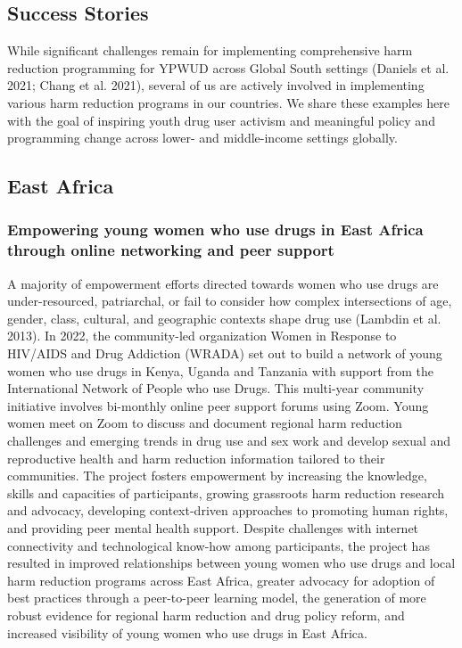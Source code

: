 \documentclass[
  letterpaper,
  DIV=11,
  numbers=noendperiod]{scrartcl}
\begin{document}
\subsection{Success Stories}\label{sec-success}

While significant challenges remain for implementing comprehensive harm
reduction programming for YPWUD across Global South settings (Daniels et
al. 2021; Chang et al. 2021), several of us are actively involved in
implementing various harm reduction programs in our countries. We share
these examples here with the goal of inspiring youth drug user activism
and meaningful policy and programming change across lower- and
middle-income settings globally.

\subsection{East Africa}

\subsubsection{Empowering young women who use drugs in East Africa
through online networking and peer
support}\label{empowering-young-women-who-use-drugs-in-east-africa-through-online-networking-and-peer-support}

A majority of empowerment efforts directed towards women who use drugs
are under-resourced, patriarchal, or fail to consider how complex
intersections of age, gender, class, cultural, and geographic contexts
shape drug use (Lambdin et al. 2013). In 2022, the community-led
organization Women in Response to HIV/AIDS and Drug Addiction (WRADA)
set out to build a network of young women who use drugs in Kenya, Uganda
and Tanzania with support from the International Network of People who
use Drugs. This multi-year community initiative involves bi-monthly
online peer support forums using Zoom. Young women meet on Zoom to
discuss and document regional harm reduction challenges and emerging
trends in drug use and sex work and develop sexual and reproductive
health and harm reduction information tailored to their communities. The
project fosters empowerment by increasing the knowledge, skills and
capacities of participants, growing grassroots harm reduction research
and advocacy, developing context-driven approaches to promoting human
rights, and providing peer mental health support. Despite challenges
with internet connectivity and technological know-how among
participants, the project has resulted in improved relationships between
young women who use drugs and local harm reduction programs across East
Africa, greater advocacy for adoption of best practices through a
peer-to-peer learning model, the generation of more robust evidence for
regional harm reduction and drug policy reform, and increased visibility
of young women who use drugs in East Africa.
\end{document}
